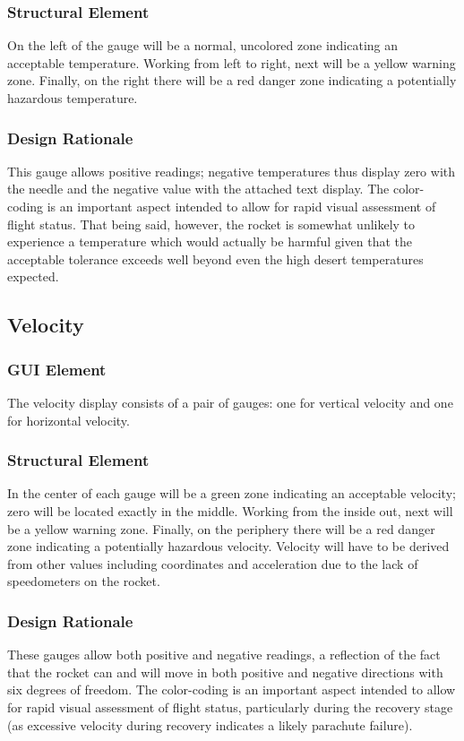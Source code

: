\documentclass[journal,10pt,onecolumn,compsoc]{IEEEtran}
\begin{document}
		\subsubsection{Structural Element}
			On the left of the gauge will be a normal, uncolored zone indicating an acceptable temperature.
			Working from left to right, next will be a yellow warning zone.
			Finally, on the right there will be a red danger zone indicating a potentially hazardous temperature.
						
		\subsubsection{Design Rationale}
			This gauge allows positive readings; negative temperatures thus display zero with the needle and the negative value with the attached text display. 
			The color-coding is an important aspect intended to allow for rapid visual assessment of flight status.
			That being said, however, the rocket is somewhat unlikely to experience a temperature which would actually be harmful given that the acceptable tolerance exceeds well beyond even the high desert temperatures expected.
    
  \subsection{Velocity}

		\subsubsection{GUI Element}
			The velocity display consists of a pair of gauges: one for vertical velocity and one for horizontal velocity.
			
		\subsubsection{Structural Element}
			In the center of each gauge will be a green zone indicating an acceptable velocity; zero will be located exactly in the middle.
			Working from the inside out, next will be a yellow warning zone.
			Finally, on the periphery there will be a red danger zone indicating a potentially hazardous velocity.
			Velocity will have to be derived from other values including coordinates and acceleration due to the lack of speedometers on the rocket.
			
		\subsubsection{Design Rationale}
			These gauges allow both positive and negative readings, a reflection of the fact that the rocket can and will move in both positive and negative directions with six degrees of freedom.
			The color-coding is an important aspect intended to allow for rapid visual assessment of flight status, particularly during the recovery stage (as excessive velocity during recovery indicates a likely parachute failure).
      
\end{document}
